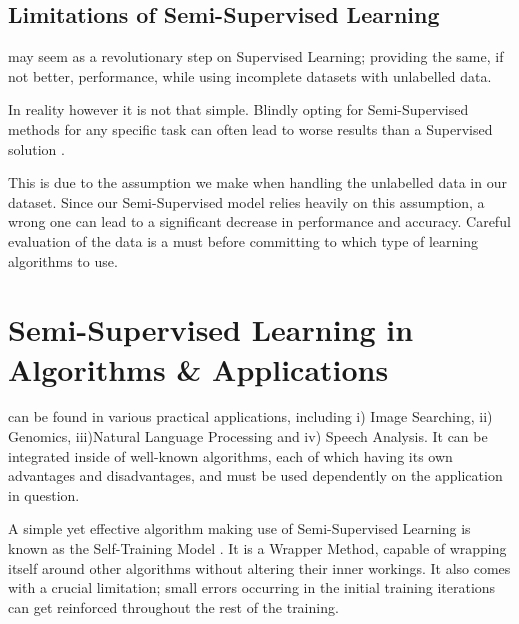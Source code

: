 \subsection{Limitations of Semi-Supervised Learning}\label{sec:limitations}

 may seem as a revolutionary step on Supervised Learning; providing the same, if not better, performance, while using incomplete datasets with unlabelled data.

In reality however it is not that simple. Blindly opting for Semi-Supervised methods for any specific task can often lead to worse results than a Supervised solution \citep{zhu2009introduction}. 

This is due to the assumption we make when handling the unlabelled data in our dataset. Since our Semi-Supervised model relies heavily on this assumption, a wrong one can lead to a significant decrease in performance and accuracy. Careful evaluation of the data is a must before committing to which type of learning algorithms to use.

\section{Semi-Supervised Learning in Algorithms \& Applications}\label{sec:applications}

 can be found in various practical applications, including i) Image Searching, ii) Genomics, iii)Natural Language Processing and iv) Speech Analysis. It can be integrated inside of well-known algorithms, each of which having its own advantages and disadvantages, and must be used dependently on the application in question.

A simple yet effective algorithm making use of Semi-Supervised Learning is known as the Self-Training Model \citep{mcclosky2006effective, zhu2009introduction}. It is a Wrapper Method, capable of wrapping itself around other algorithms without altering their inner workings. It also comes with a crucial limitation; small errors occurring in the initial training iterations can get reinforced throughout the rest of the training.

